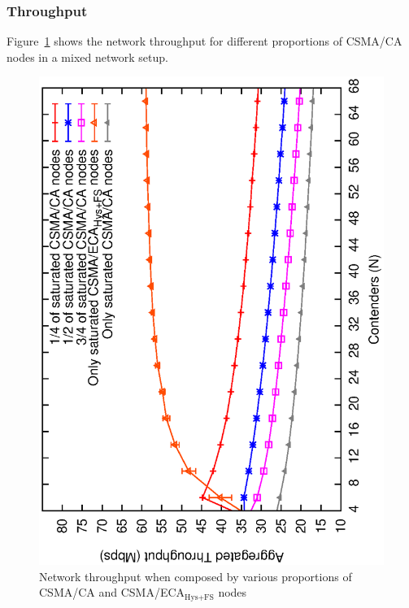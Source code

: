 	\subsubsection{Throughput}
	
	Figure~\ref{fig:mixedThroughput-sat} shows the network throughput for different proportions of CSMA/CA nodes in a mixed network setup.
	
	\begin{figure}[tb]
		\centering
		\includegraphics[width=0.7\linewidth,angle=-90]{figures/saturated/mixed/throughput-mixed/throughput-saturated-mixed.eps}
		\caption{Network throughput when composed by various proportions of CSMA/CA and CSMA/ECA$_{\text{Hys+FS}}$ nodes}
		\label{fig:mixedThroughput-sat}
	\end{figure}
	
